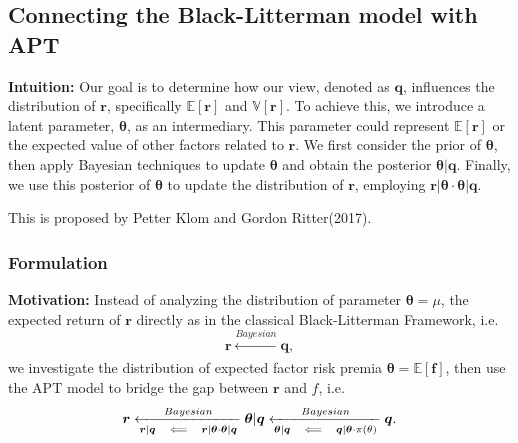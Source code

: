 \documentclass[13pt]{article}
\theoremstyle{definition}
\theoremstyle{remark}
\newcommand{\EE}{\mathbb{E}}
\begin{document}
\subsection{Connecting the Black-Litterman model with APT}
{\color{C6}\textbf{Intuition:} Our goal is to determine how our view, denoted as $\bm{q}$, influences the distribution of $\bm{r}$, specifically $\mathbb{E}[\bm{r}]$ and $\mathbb{V}[\bm{r}]$. To achieve this, we introduce a latent parameter, $\bm{\theta}$, as an intermediary. This parameter could represent $\mathbb{E}[\bm{r}]$ or the expected value of other factors related to $\bm{r}$. We first consider the prior of $\bm{\theta}$, then apply Bayesian techniques to update $\bm{\theta}$ and obtain the posterior $\bm{\theta}|\bm{q}$. Finally, we use this posterior of $\bm{\theta}$ to update the distribution of $\bm{r}$, employing $\bm{r}|\bm{\theta} \cdot \bm{\theta}|\bm{q}$.}

This is proposed by Petter Klom and Gordon Ritter(2017).
\subsubsection{Formulation}
{\color{C6}\textbf{Motivation:} Instead of analyzing the distribution of parameter $\bm{\theta}=\mu$, the expected return of $\bm{r}$ directly as in the classical Black-Litterman Framework, i.e.
\[
\bm{r} \xleftarrow[]{Bayesian}\bm{q},
\]we investigate the distribution of expected factor risk premia $\bm{\theta}=\EE[\bm{f}]$, then use the APT model to bridge the gap between $\bm{r}$ and $f$, i.e.
\[
\bm{r} \xleftarrow[\bm{r}|\bm{q}\quad \Longleftarrow \quad\bm{r}|\bm{\theta}\cdot \bm{\theta}|\bm{q}]{Bayesian}\bm{\theta}|\bm{q}\xleftarrow[\bm{\theta}|\bm{q}\quad \Longleftarrow \quad \bm{q}|\bm{\theta}\cdot \pi(\theta)]{Bayesian}\bm{q}.
\]}
\end{document}
